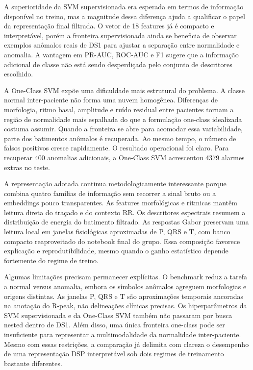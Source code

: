 A superioridade da SVM supervisionada era esperada em termos de informação
disponível no treino, mas a magnitude dessa diferença ajuda a qualificar o
papel da representação final filtrada. O vetor de 18 features já é compacto e
interpretável, porém a fronteira supervisionada ainda se beneficia de observar
exemplos anômalos reais de DS1 para ajustar a separação entre normalidade e
anomalia. A vantagem em PR-AUC, ROC-AUC e F1 sugere que a informação adicional
de classe não está sendo desperdiçada pelo conjunto de descritores escolhido.

A One-Class SVM expõe uma dificuldade mais estrutural do problema. A classe
normal inter-paciente não forma uma nuvem homogênea. Diferenças de morfologia,
ritmo basal, amplitude e ruído residual entre pacientes tornam a região de
normalidade mais espalhada do que a formulação one-class idealizada costuma
assumir. Quando a fronteira se abre para acomodar essa variabilidade, parte dos
batimentos anômalos é recuperada. Ao mesmo tempo, o número de falsos positivos
cresce rapidamente. O resultado operacional foi claro. Para recuperar
400 anomalias adicionais, a One-Class SVM acrescentou 4379 alarmes extras no
teste.

A representação adotada continua metodologicamente interessante porque combina
quatro famílias de informação sem recorrer a sinal bruto ou a embeddings pouco
transparentes. As features morfológicas e rítmicas mantêm leitura direta do
traçado e do contexto RR. Os descritores espectrais resumem a distribuição de
energia do batimento filtrado. As respostas Gabor preservam uma leitura local
em janelas fisiológicas aproximadas de P, QRS e T, com banco compacto
reaproveitado do notebook final do grupo. Essa composição favorece explicação e
reprodutibilidade, mesmo quando o ganho estatístico depende fortemente do
regime de treino.

Algumas limitações precisam permanecer explícitas. O benchmark reduz a tarefa a
normal versus anomalia, embora os símbolos anômalos agreguem morfologias e
origens distintas. As janelas P, QRS e T são aproximações temporais ancoradas
na anotação do R-peak, não delineações clínicas precisas. Os hiperparâmetros da
SVM supervisionada e da One-Class SVM também não passaram por busca nested
dentro de DS1. Além disso, uma única fronteira one-class pode ser insuficiente
para representar a multimodalidade da normalidade inter-paciente. Mesmo com
essas restrições, a comparação já delimita com clareza o desempenho de uma
representação DSP interpretável sob dois regimes de treinamento bastante
diferentes.
